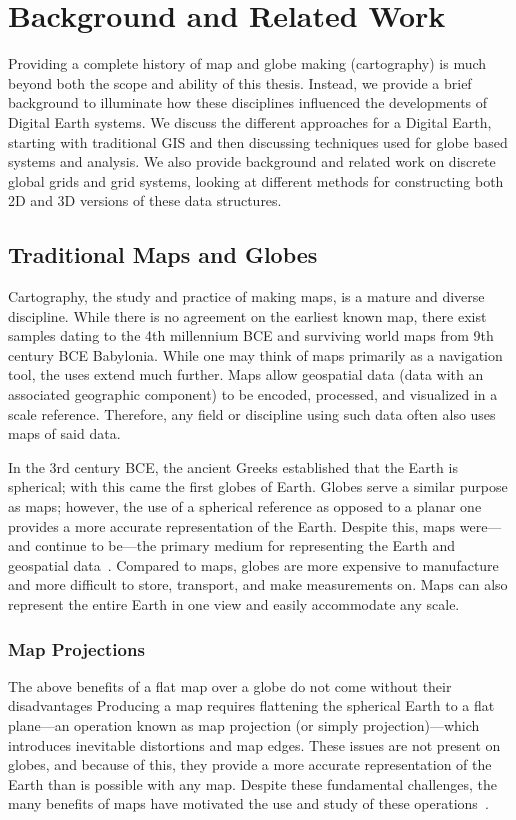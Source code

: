 \chapter{Background and Related Work} \label{chap:background}
Providing a complete history of map and globe making (cartography) is much beyond both the scope and ability of this thesis.
Instead, we provide a brief background to illuminate how these disciplines influenced the developments of Digital Earth systems.
We discuss the different approaches for a Digital Earth, starting with traditional GIS and then discussing techniques used for globe based systems and analysis.
We also provide background and related work on discrete global grids and grid systems, looking at different methods for constructing both 2D and 3D versions of these data structures.


\section{Traditional Maps and Globes}
Cartography, the study and practice of making maps, is a mature and diverse discipline.
While there is no agreement on the earliest known map, there exist samples dating to the 4th millennium BCE and surviving world maps from 9th century BCE Babylonia.
While one may think of maps primarily as a navigation tool, the uses extend much further.
Maps allow geospatial data (data with an associated geographic component) to be encoded, processed, and visualized in a scale reference.
Therefore, any field or discipline using such data often also uses maps of said data.


In the 3rd century BCE, the ancient Greeks established that the Earth is spherical; with this came the first globes of Earth.
Globes serve a similar purpose as maps; however, the use of a spherical reference as opposed to a planar one provides a more accurate representation of the Earth.
Despite this, maps were---and continue to be---the primary medium for representing the Earth and geospatial data~\cite{hruby20182000}.
Compared to maps, globes are more expensive to manufacture and more difficult to store, transport, and make measurements on.
Maps can also represent the entire Earth in one view and easily accommodate any scale.


\subsection{Map Projections}
The above benefits of a flat map over a globe do not come without their disadvantages
Producing a map requires flattening the spherical Earth to a flat plane---an operation known as map projection (or simply projection)---which introduces inevitable distortions and map edges.
These issues are not present on globes, and because of this, they provide a more accurate representation of the Earth than is possible with any map.
Despite these fundamental challenges, the many benefits of maps have motivated the use and study of these operations~\cite{snyder1987map, snyder1997flattening}.


